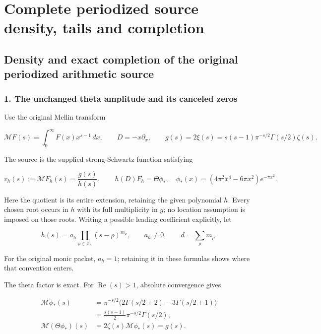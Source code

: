 \begingroup

\section{Complete periodized source density, tails and completion}


\subsection{Density and exact completion of the original periodized arithmetic source}\label{density-and-exact-completion-of-the-original-periodized-arithmetic-source}

\subsubsection{1. The unchanged theta amplitude and its canceled zeros}\label{the-unchanged-theta-amplitude-and-its-canceled-zeros}

Use the original Mellin transform

\[
\mathcal MF(s)=\int_0^\infty F(x)x^{s-1}\,dx,
\qquad D=-x\partial_x,
\qquad g(s)=2\xi(s)=s(s-1)\pi^{-s/2}\Gamma(s/2)\zeta(s).
\tag{PSD1}
\]

The source is the supplied strong-Schwartz function satisfying

\[
v_h(s):=\mathcal MF_h(s)=\frac{g(s)}{h(s)},
\qquad h(D)F_h=\Theta\phi_*,
\quad \phi_*(x)=(4\pi^2x^4-6\pi x^2)e^{-\pi x^2}.
\tag{PSD2}
\]

Here the quotient is its entire extension, retaining the given polynomial \(h\). Every chosen root occurs in \(h\) with its full multiplicity in \(g\); no location assumption is imposed on those roots. Writing a possible leading coefficient explicitly, let

\[
h(s)=a_h\prod_{\rho\in Z_h}(s-\rho)^{m_\rho},
\qquad a_h\ne0,\qquad d=\sum_\rho m_\rho.
\tag{PSD3}
\]

For the original monic packet, \(a_h=1\); retaining it in these formulas shows where that convention enters.

The theta factor is exact. For \(\operatorname{Re}(s)>1\), absolute convergence gives

\[
\begin{aligned}
\mathcal M\phi_*(s)
&=\pi^{-s/2}\bigl(2\Gamma(s/2+2)-3\Gamma(s/2+1)\bigr)\\
&=\frac{s(s-1)}2\pi^{-s/2}\Gamma(s/2),\\
\mathcal M(\Theta\phi_*)(s)
&=2\zeta(s)\mathcal M\phi_*(s)=g(s).
\end{aligned}
\tag{PSD4}
\]

